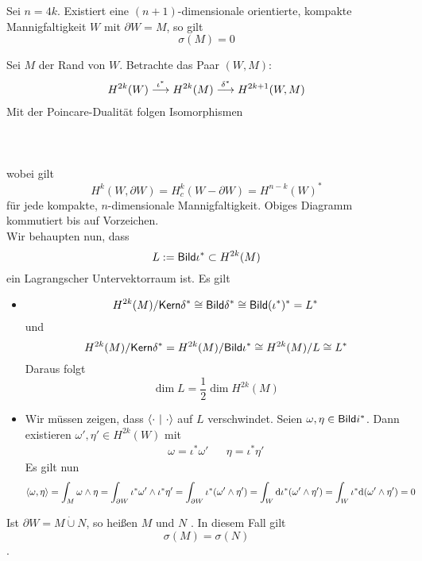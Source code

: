 Sei $n = 4k$. Existiert eine $(n+1)$-dimensionale orientierte, kompakte Mannigfaltigkeit $W$ mit $\partial W = M$, so gilt
\[ \sigma(M) = 0 \]
\begin{Beweis}{}
Sei $M$ der Rand von $W$. Betrachte das Paar $(W,M)$:
\begin{align*}
H^{2k}(W)
\overset{\iota^*}{\longrightarrow} H^{2k}(M)
\overset{\delta^*}{\longrightarrow} H^{2k+1}(W,M) 
\end{align*}
Mit der Poincare-Dualität folgen Isomorphismen\\\\
\\\\
wobei gilt
\[ H^k(W, \partial W) = H^{k}_c(W - \partial W) = H^{n-k}(W)^* \]
für jede kompakte, $n$-dimensionale Mannigfaltigkeit. Obiges Diagramm kommutiert bis auf Vorzeichen.\\
Wir behaupten nun, dass
\[ L:= \textsf{Bild} \iota^* \subset H^{2k}(M) \]
ein Lagrangscher Untervektorraum ist. Es gilt
\begin{itemize}
	\item
	\[H^{2k}(M)/\textsf{Kern} \delta^* \overset{}{\cong} \textsf{Bild} \delta^* \overset{}{\cong} \textsf{Bild} (\iota^*)^* = L^*\]
	und
	\[H^{2k}(M)/\textsf{Kern} \delta^* = H^{2k}(M) / \textsf{Bild} \iota^* \overset{}{\cong} H^{2k}(M)/L \overset{}{\cong} L^*\]
	Daraus folgt
	\[ \dim L = \frac{1}{2} \dim H^{2k}(M) \]
	\item Wir müssen zeigen, dass $\left<\cdot~|~\cdot\right>$ auf $L$ verschwindet. Seien $\omega, \eta \in \textsf{Bild} i^*$. Dann existieren $\omega', \eta' \in H^{2k}(W)$ mit
	\begin{align*}
	\omega = \iota^* \omega' && \eta = \iota^*\eta'
	\end{align*}
	Es gilt nun
	\begin{align*}
	\left<\omega, \eta\right> &=
	\int_M \omega \wedge \eta
	= \int_{\partial W} \iota^*\omega' \wedge \iota^* \eta'
	= \int_{\partial W} \iota^*(\omega'\wedge \eta')
	= \int_W \text{d} \iota^*(\omega' \wedge \eta')
	=\int_W  \iota^*\text{d}(\omega' \wedge \eta')
	= 0
	\end{align*}
	
	
\end{itemize}
\end{Beweis}


\Kor{}
Ist $\partial W = M \dot{\cup} N$, so heißen $M$ und $N$ . In diesem Fall gilt
\[ \sigma(M) = \sigma(N) \].
